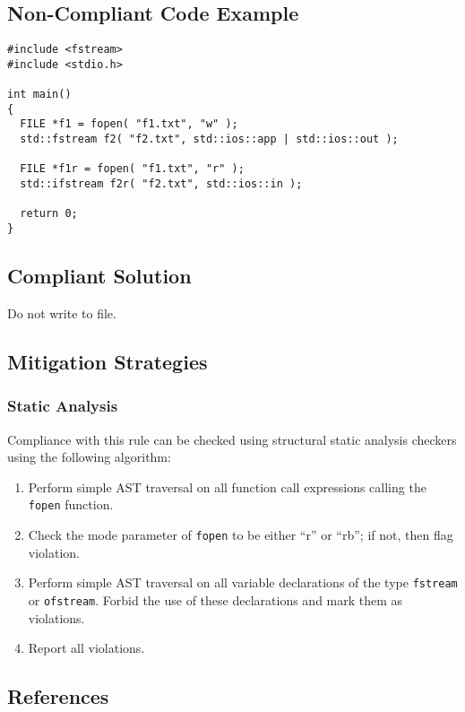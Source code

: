 \subsection{Non-Compliant Code Example}

\begin{verbatim}
#include <fstream>
#include <stdio.h>

int main()
{
  FILE *f1 = fopen( "f1.txt", "w" );
  std::fstream f2( "f2.txt", std::ios::app | std::ios::out );

  FILE *f1r = fopen( "f1.txt", "r" );
  std::ifstream f2r( "f2.txt", std::ios::in );

  return 0;
}
\end{verbatim}

\subsection{Compliant Solution}
Do not write to file.

\subsection{Mitigation Strategies}
\subsubsection{Static Analysis} 

Compliance with this rule can be checked using structural static analysis checkers using the following algorithm:

\begin{enumerate}
\item Perform simple AST traversal on all function call expressions calling the {\tt fopen} function.
\item Check the mode parameter of {\tt fopen} to be either ``r'' or ``rb''; if not, then flag violation.
\item Perform simple AST traversal on all variable declarations of the type {\tt fstream} or {\tt ofstream}. Forbid the use of these declarations and mark them as violations.
\item Report all violations. 
\end{enumerate}

\subsection{References}

